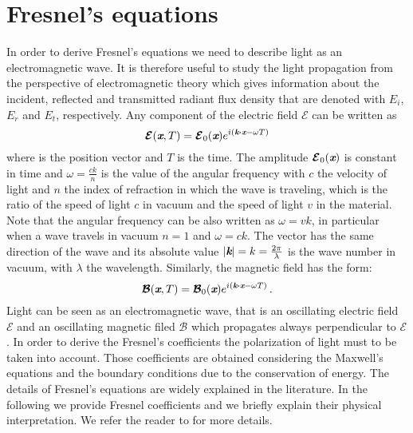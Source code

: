 \section{Fresnel's equations}\label{sec:fresnel}
In order to derive Fresnel's equations we need to describe light as an electromagnetic wave. 
It is therefore useful to study the light propagation from the perspective of electromagnetic theory which gives information about the incident, reflected and transmitted radiant flux density that are denoted with $E_i$, $E_r$ and $E_t$, respectively.  
Any component of the electric field $\boldsymbol{\mathcal{E}}$ can be written as
\begin{equation}\label{electric_field}
\boldsymbol{\mathcal{E}}(\textit{\textbf{x}}, T) = \boldsymbol{\mathcal{E}}_0(\textit{\textbf{x}} )e^{i( \textit{\textbf{k}}\boldsymbol{\cdot}\textit{\textbf{x}}-\omega T )}
\end{equation}
where  is the position vector and $T$ is the time. The amplitude $\boldsymbol{\mathcal{E}}_0(\textit{\textbf{x}})$ is constant in time and $\omega = \frac{c k}{n}$ is the value of the angular frequency with $c$ the velocity of light and $n$ the index of refraction in which the wave is traveling, which is the ratio of the speed of light $c$ in vacuum and the speed of light $v$ in the material. Note that the angular frequency can be also written as $\omega = vk$, in particular when a wave travels in vacuum $n=1$ and $\omega=ck$. The vector  has the same direction of the wave and its absolute value 
$|\textit{\textbf{k}}| = k = \frac{2\pi}{\lambda}$ is the wave number in vacuum, with $\lambda$ the wavelength. Similarly, the magnetic field has the form:
\begin{equation}
\boldsymbol{\mathcal{B}}(\textit{\textbf{x}}, T) = \boldsymbol{\mathcal{B}}_0(\textit{\textbf{x}}) e^{i( \textit{\textbf{k}}\boldsymbol{\cdot} \textit{\textbf{x}}-\omega T )}\,.
\end{equation}
Light can be seen as an electromagnetic wave, that is an oscillating electric field $\boldsymbol{\mathcal{E}}$ and an oscillating magnetic filed $\boldsymbol{\mathcal{B}}$ which propagates  always perpendicular to $\boldsymbol{\mathcal{E}}$. 
In order to derive the Fresnel's coefficients the polarization of light must to be taken into account. 
Those coefficients are obtained considering the Maxwell's equations and the boundary conditions due to the conservation of energy.
The details of Fresnel's equations are widely explained in the literature. 
In the following we provide Fresnel coefficients and we briefly explain their physical interpretation. We refer the reader to \cite{born2013principles, hecht1998hecht} for more details. 
